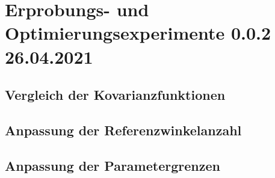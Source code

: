 %

\chapter{Erprobungs- und Optimierungsexperimente 0.0.2 26.04.2021}\label{ch:erprobungs-u-opt-exp}
	
	
\section{Vergleich der Kovarianzfunktionen}\label{sec:exp1}


\section{Anpassung der Referenzwinkelanzahl}\label{sec:exp2}


\section{Anpassung der Parametergrenzen}\label{sec:exp4}
	
